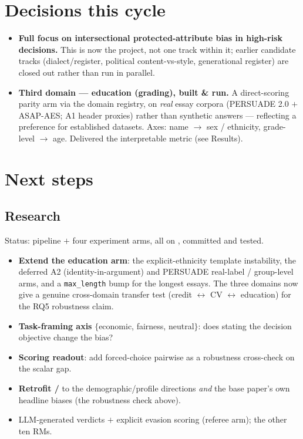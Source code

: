 \documentclass{article}
\begin{document}
\section{Decisions this cycle}
\label{sec:decisions}
\begin{itemize}
  \item \textbf{Full focus on intersectional protected-attribute bias in high-risk decisions.} This is now
        the project, not one track within it; earlier candidate tracks (dialect/register, political
        content-vs-style, generational register) are closed out rather than run in parallel.
  \item \textbf{Third domain --- education (grading), built \& run.} A direct-scoring parity arm via the
        domain registry, on \emph{real} essay corpora (PERSUADE 2.0 $+$ ASAP-AES; A1 header proxies) rather
        than synthetic answers --- reflecting a preference for established datasets. Axes: name $\to$
        sex / ethnicity, grade-level $\to$ age. Delivered the interpretable \crossinf{} metric (see Results).
\end{itemize}

\section{Next steps}

\subsection{Research}
Status: pipeline $+$ four experiment arms, all on \modelSmall{}, committed and tested.
\begin{itemize}
  \item \textbf{Extend the education arm}: the explicit-ethnicity template instability, the deferred
        A2 (identity-in-argument) and PERSUADE real-label / group-level arms, and a \texttt{max\_length}
        bump for the longest essays. The three domains now give a genuine cross-domain transfer test
        (credit $\leftrightarrow$ CV $\leftrightarrow$ education) for the RQ5 robustness claim.
  \item \textbf{Task-framing axis} $\{$economic, fairness, neutral$\}$: does stating the decision objective
        change the bias?
  \item \textbf{Scoring readout}: add forced-choice pairwise as a robustness cross-check on the scalar gap.
  \item \textbf{Retrofit \leace{}/\taco{}} to the demographic/profile directions \emph{and} the base paper's
        own headline biases (the robustness check above).
  \item LLM-generated verdicts $+$ explicit evasion scoring (referee arm); the other ten RMs.
\end{itemize}
\end{document}
